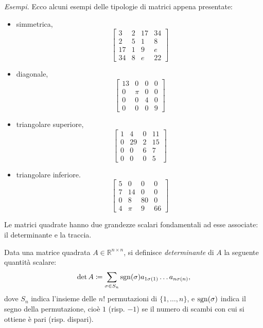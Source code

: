 \textit{Esempi.}
Ecco alcuni esempi delle tipologie di matrici appena presentate:
\begin{itemize}
\item simmetrica,\begin{equation*}
\begin{bmatrix}
3 & 2 & 17 & 34\\
2 & 5 & 1 & 8\\
17 & 1 & 9 & e\\
34 & 8 & e & 22
\end{bmatrix}
\end{equation*}
\item diagonale,\begin{equation*}
\begin{bmatrix}
13 & 0 & 0 & 0\\
0 & \pi  & 0 & 0\\
0 & 0 & 4 & 0\\
0 & 0 & 0 & 9
\end{bmatrix}
\end{equation*}
\item triangolare superiore,\begin{equation*}
\begin{bmatrix}
1 & 4 & 0 & 11\\
0 & 29 & 2 & 15\\
0 & 0 & 6 & 7\\
0 & 0 & 0 & 5
\end{bmatrix}
\end{equation*}
\item triangolare inferiore.\begin{equation*}
\begin{bmatrix}
5 & 0 & 0 & 0\\
7 & 14 & 0 & 0\\
0 & 8 & 80 & 0\\
4 & \pi  & 9 & 66
\end{bmatrix}
\end{equation*}
\end{itemize}

Le matrici quadrate hanno due grandezze scalari fondamentali ad esse associate: il determinante e la traccia.
\begin{definition}
	[Determinante]
	Data una matrice quadrata $A\in \mathbb{R}^{n\times n}$, si definisce \textit{determinante} di $A$ la seguente quantità scalare:
	\begin{equation*}
		\operatorname{det} A \coloneqq \sum\limits _{\sigma \in S_{n}}\mathop{\mathrm{sgn}}( \sigma ) a_{1\sigma ( 1)} \dotsc a_{n\sigma ( n)} ,
	\end{equation*}
	dove $S_{n}$ indica l'insieme delle $n!$ permutazioni di $\{1,\dotsc ,n\}$, e $\mathop{\mathrm{sgn}}( \sigma )$ indica il segno della permutazione, cioè $1$ (risp. $-1$) se il numero di scambi con cui si ottiene è pari (risp. dispari).
\end{definition}

